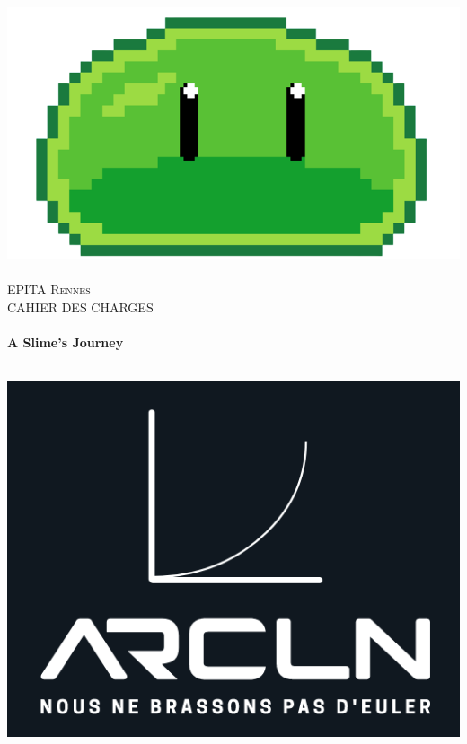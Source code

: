 
\begin{titlepage}
  \begin{sffamily}
  \begin{center}

  
    \includegraphics[scale=0.3]{logo}~\\[1.5cm]

    \textsc{\LARGE EPITA Rennes}\\[0.5cm]

    \textsc{\Large CAHIER DES CHARGES}\\[1.5cm]

    \HRule \\[0.4cm]
     { \huge \bfseries  A Slime's Journey \\[0.4cm] }

    \HRule \\[2cm]
    \includegraphics[scale=0.4]{arcln}
     \\[0.5cm]


\end{center}
\end{sffamily}
\end{titlepage}
